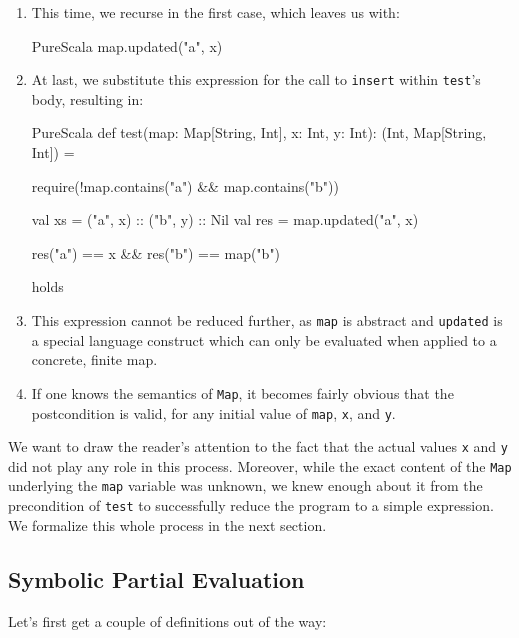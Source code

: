 \documentclass[a4paper,twoside]{article}
\newcommand{\stt}[1]{\texttt{\small{#1}}}
\begin{document}
\begin{enumerate}
\item This time, we recurse in the first case, which leaves us with:

\begin{ShortCode}{PureScala}
map.updated("a", x)
\end{ShortCode}

\item At last, we substitute this expression for the call to \stt{insert} within \stt{test}'s body, resulting in:

\begin{ShortCode}{PureScala}
def test(map: Map[String, Int], x: Int, y: Int): (Int, Map[String, Int]) = {
  require(!map.contains("a") && map.contains("b"))

  val xs  = ("a", x) :: ("b", y) :: Nil
  val res = map.updated("a", x)

  res("a") == x && res("b") == map("b")
} holds
\end{ShortCode}

\item This expression cannot be reduced further, as \stt{map} is abstract and \stt{updated} is a special language construct which can only be evaluated when applied to a concrete, finite map.

\item If one knows the semantics of \stt{Map}, it becomes fairly obvious that the postcondition is valid, for any initial value of \stt{map}, \stt{x}, and \stt{y}.

\end{enumerate}

We want to draw the reader's attention to the fact that the actual values \stt{x} and \stt{y} did not play any role in this process. Moreover, while the exact content of the \stt{Map} underlying the \stt{map} variable was unknown, we knew enough about it from the precondition of \stt{test} to successfully reduce the program to a simple expression. We formalize this whole process in the next section.

\subsection{Symbolic Partial Evaluation}

Let's first get a couple of definitions out of the way:
\end{document}
